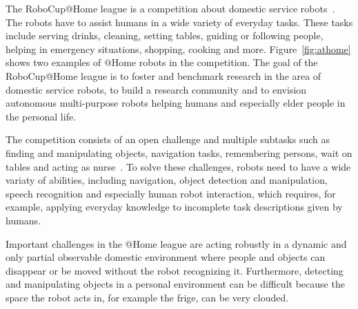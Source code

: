 \documentclass[a4paper,11pt]{article}
\newcommand{\reffig}[1]{Figure~\ref{#1}}
\begin{document}
The RoboCup@Home league is a competition about domestic service
robots~\cite{wisspeintner2009robocup}. The robots have to assist
humans in a wide variety of everyday tasks. These tasks include
serving drinks, cleaning, setting tables, guiding or following people,
helping in emergency situations, shopping, cooking and
more. \reffig{fig:athome} shows two examples of @Home robots in the
competition.
%
The goal of the RoboCup@Home league is to foster and benchmark
research in the area of domestic service robots, to build a research
community and to envision autonomous multi-purpose robots helping
humans and especially elder people in the personal life.

The competition consists of an open challenge and multiple subtasks
such as finding and manipulating objects, navigation tasks,
remembering persons, wait on tables and acting as
nurse~\cite{athome-rules}. To solve these challenges, robots need to
have a wide variaty of abilities, including navigation, object
detection and manipulation, speech recognition and especially human
robot interaction, which requires, for example, applying everyday
knowledge to incomplete task descriptions given by humans.

Important challenges in the @Home league are acting robustly in a
dynamic and only partial observable domestic environment where people
and objects can disappear or be moved without the robot recognizing
it. Furthermore, detecting and manipulating objects in a personal
environment can be difficult because the space the robot acts in, for
example the frige, can be very clouded.

\end{document}

